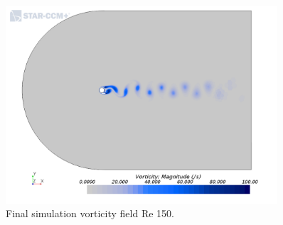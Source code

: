 \documentclass[10pt,english]{article}
\begin{document}
 \begin{figure}[h]
\centering
\includegraphics[trim={0.0cm 0cm 0.0cm 0cm},clip,width=0.9\textwidth]{cylinder_2_016_ScalarScene2.png}
\vspace{-5pt}
\caption{Final simulation vorticity field Re 150.}
\label{f:cylinder_2_016_ScalarScene2}
\end{figure}
\end{document}
